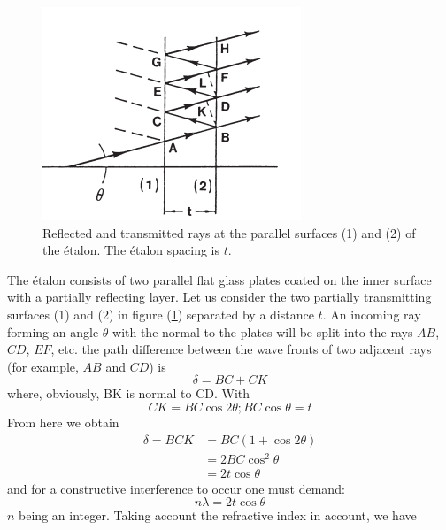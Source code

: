 \documentclass[%
 reprint,
nofootinbib,
 amsmath,amssymb,
 aps,
floatfix,
]{revtex4-2}
\begin{document}
    \begin{figure}
        \centering
        \includegraphics{Figures/reflec.png}
        \caption{Reflected and transmitted rays at the parallel surfaces (1) and (2) of the étalon. The étalon spacing is $t$.}
        \label{fig:reflec}
    \end{figure}
    \par 
    The étalon consists of two parallel flat glass plates coated on the inner surface with a partially reflecting layer. Let us consider the two partially transmitting surfaces (1) and (2) in figure (\ref{fig:reflec}) separated by a distance $t$. An incoming ray forming an angle $\theta$ with the normal to the plates will be split into the rays $AB$, $CD$, $EF$, etc. the path difference between the wave fronts of two adjacent rays (for example, $AB$ and $CD$) is
    \begin{equation}
        \delta = BC + CK
    \end{equation}
    where, obviously, BK is normal to CD. With
    \begin{equation}
        CK = BC \cos 2 \theta; BC \cos \theta = t
    \end{equation}
    From here we obtain
    \begin{equation}
        \begin{split}
            \delta = BCK
            &= BC (1 + \cos 2 \theta) \\
            &= 2 BC \cos^2 \theta \\
            &= 2 t \cos \theta
        \end{split}
    \end{equation}
    and for a constructive interference to occur one must demand:
    \begin{equation}
        n \lambda = 2 t \cos \theta
    \end{equation}
    $n$ being an integer. Taking account the refractive index in account, we have
\end{document}
